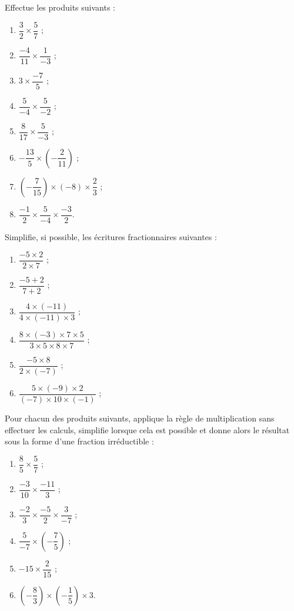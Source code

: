 \begin{exercice}
Effectue les produits suivants :
\begin{enumerate}
\item $\dfrac{3}{2} \times \dfrac{5}{7}$ ;
\item $\dfrac{-4}{11} \times \dfrac{1}{-3}$ ;
\item $3 \times \dfrac{-7}{5}$ ;
\item $\dfrac{5}{-4} \times \dfrac{5}{-2}$ ;
\item $\dfrac{8}{17} \times \dfrac{5}{-3}$ ;
\item $-\dfrac{13}{5} \times \left(-\dfrac{2}{11}\right)$ ;
\item $\left(-\dfrac{7}{15}\right) \times (-8) \times \dfrac{2}{3}$ ;
\item $\dfrac{-1}{2} \times \dfrac{5}{-4} \times \dfrac{-3}{2}$.
\end{enumerate}
\end{exercice}





\begin{exercice}
Simplifie, si possible, les écritures fractionnaires suivantes :
\begin{enumerate}
\item $\dfrac{-5 \times 2}{2 \times 7}$ ;  
\item $\dfrac{-5 + 2}{7 + 2}$ ;
\item $\dfrac{4 \times (-11)}{4 \times (-11) \times 3}$ ;
\item $\dfrac{8 \times (-3) \times 7 \times 5}{3 \times 5 \times 8 \times 7}$ ;
\item $\dfrac{-5 \times 8}{2 \times (-7)}$ ;
\item $\dfrac{5 \times (-9) \times 2}{(-7) \times 10 \times (-1)}$ ;
\end{enumerate}
\end{exercice}





\begin{exercice}
Pour chacun des produits suivants, applique la règle de multiplication sans effectuer les calculs, simplifie lorsque cela est possible et donne alors le résultat sous la forme d'une fraction irréductible :
\begin{enumerate}
\item $\dfrac{8}{5} \times \dfrac{5}{7}$ ;
\item $\dfrac{-3}{10} \times \dfrac{-11}{3}$ ;
\item $\dfrac{-2}{3} \times \dfrac{-5}{2} \times \dfrac{3}{-7}$ ;
\item $\dfrac{5}{-7} \times \left(-\dfrac{7}{5}\right)$ ;
\item $-15 \times \dfrac{2}{15}$ ;
\item $\left(-\dfrac{8}{3}\right) \times \left(-\dfrac{1}{5}\right) \times 3$.
\end{enumerate}
\end{exercice}




